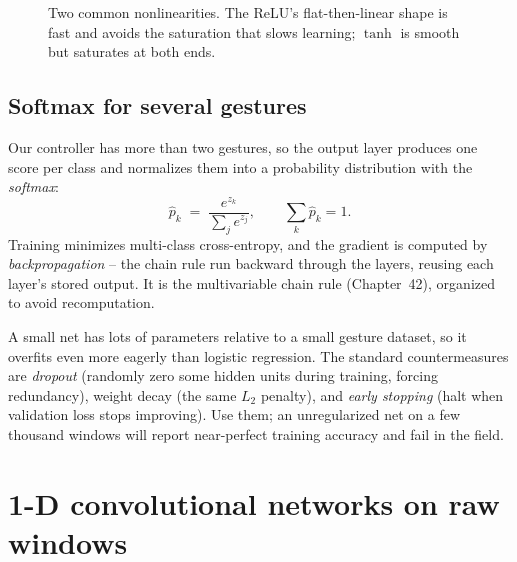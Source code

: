 \begin{figure}[H]
\centering
{}
\caption{Two common nonlinearities. The ReLU's flat-then-linear shape is fast and avoids
the saturation that slows learning; $\tanh$ is smooth but saturates at both ends.}
\label{ch39:fig-relu}
\end{figure}

\subsection{Softmax for several gestures}
\label{ch39:softmax}

Our controller has more than two gestures, so the output layer produces one score per
class and normalizes them into a probability distribution with the \emph{softmax}:
\[
  \hat{p}_k \;=\; \frac{e^{z_k}}{\sum_{j} e^{z_j}}, \qquad \sum_k \hat{p}_k = 1.
\]
Training minimizes multi-class cross-entropy, and the gradient is computed by
\emph{backpropagation} -- the chain rule run backward through the layers, reusing each
layer's stored output. It is the multivariable chain rule (Chapter~42), organized to avoid
recomputation.

\begin{trapbox}
A small net has lots of parameters relative to a small gesture dataset, so it overfits
even more eagerly than logistic regression. The standard countermeasures are
\emph{dropout} (randomly zero some hidden units during training, forcing redundancy),
weight decay (the same $L_2$ penalty), and \emph{early stopping} (halt when validation
loss stops improving). Use them; an unregularized net on a few thousand windows will
report near-perfect training accuracy and fail in the field.
\end{trapbox}

\section{1-D convolutional networks on raw windows}
\label{ch39:cnn}

